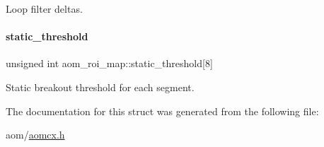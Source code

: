 Loop filter deltas. \mbox{\label{structaom__roi__map_a68f795675cf54a123c89e2f9dda9063f}} 
\paragraph{\texorpdfstring{static\+\_\+threshold}{static\_threshold}}
{\footnotesize\ttfamily unsigned int aom\+\_\+roi\+\_\+map\+::static\+\_\+threshold\mbox{[}8\mbox{]}}

Static breakout threshold for each segment. 

The documentation for this struct was generated from the following file\+:\begin{DoxyCompactItemize}
\item 
aom/\hyperlink{aomcx_8h}{aomcx.\+h}\end{DoxyCompactItemize}
